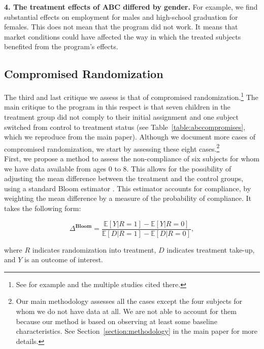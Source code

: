 \begin{appendices}
\noindent  \textbf{4. The treatment effects of ABC differed by gender.} For example, we find substantial effects on employment for males and high-school graduation for females. This does not mean that the program did not work. It means that market conditions could have affected the way in which the treated subjects benefited from the program's effects.\\

\subsection{Compromised Randomization}

\noindent The third and last critique we assess is that of compromised randomization.\footnote{See for example \citet{Baumeister-Bacharach_2000_Early-Generic} and the multiple studies cited there.} The main critique to the program in this respect is that seven children in the treatment group did not comply to their initial assignment and one subject switched from control to treatment status (see Table~\ref{table:abccompromises}, which we reproduce from the main paper). Although we document more cases of compromised randomization, we start by assessing these eight cases.\footnote{Our main methodology assesses all the cases except the four subjects for whom we do not have data at all. We are not able to account for them because our method is based on observing at least some baseline characteristics. See Section~\ref{section:methodology} in the main paper for more details.}\\

\noindent First, we propose a method to assess the non-compliance of six subjects for whom we have data available from ages 0 to 8. This allows for the possibility of adjusting the mean difference between the treatment and the control groups, using a standard Bloom estimator \citep{Bloom_1984_ER}. This estimator accounts for compliance, by weighting the mean difference by a measure of the probability of compliance. It takes the following form:

\begin{equation}
\Delta^{\textbf{Bloom}} = \frac{\mathbb{E} \left[ Y | R = 1 \right] - \mathbb{E} \left[ Y | R = 0 \right] }{\mathbb{E} \left[ D | R = 1 \right] - \mathbb{E} \left[ D | R = 0 \right]},
\end{equation}

\noindent where $R$ indicates randomization into treatment, $D$ indicates treatment take-up, and $Y$ is an outcome of interest.\\


\end{appendices}
